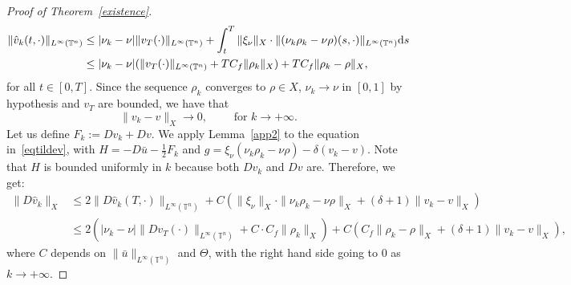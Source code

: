 \documentclass[10pt,a4paper,nouppercase,nowrite]{article}
\numberwithin{equation}{section}
\newcommand{\di}{{\rm d}}
\newcommand{\T}{\mathbb{T}}
\theoremstyle{definition}
\begin{document}
\begin{proof}[Proof of Theorem~\ref{existence}]
			\begin{equation*}
				\begin{aligned}
					\| \hat v_k (t,\cdot) \|_{L^{\infty}(\T^n)} & \le | \nu_k - \nu | \| v_T(\cdot) \|_{L^{\infty}(\T^n)} + \int_t^T \| \xi_\nu \|_X \cdot \| (\nu_k \rho_k - \nu \rho) (s,\cdot) \|_{L^{\infty}(\T^n)} \di s \\
					&\le | \nu_k - \nu |( \| v_T(\cdot) \|_{L^{\infty}(\T^n)} + T C_f \| \rho_k \|_X ) + T C_f \| \rho_k - \rho \|_X,
				\end{aligned}
			\end{equation*}
			for all $t \in [0,T]$. Since the sequence $\rho_k$ converges to $\rho \in X$, $\nu_k \to \nu$ in $[0,1]$ by hypothesis and $v_T$ are bounded, we have that
		 	$$\| v_k - v \|_X \to 0, \qquad \text{ for } k \to +\infty.$$
		 	Let us define $F_k:=Dv_k + Dv$. We apply Lemma~\ref{app2} to the equation in~\eqref{eqtildev}, with \mbox{$H=- D \bar u - \frac{1}{2}F_k$} and \mbox{$g = \xi_{\nu}(\nu_k \rho_k - \nu \rho) - \delta (v_k - v)$}. Note that $H$ is bounded uniformly in $k$ because both $Dv_k$ and $Dv$ are. Therefore, we get:
		 	\begin{equation*}
		 		\begin{aligned}
		 		\| D \hat v_k \|_X &\le 2 \| D \hat v_k(T,\cdot) \|_{L^{\infty}(\T^n)} + C \left( \| \xi_{\nu} \|_X \cdot \| \nu_k \rho_k - \nu \rho \|_X + (\delta+1) \|v_k - v \|_X \right) \\
		 		& \le 2 \left( | \nu_k - \nu | \| Dv_T(\cdot) \|_{L^{\infty}(\T^n)} + C \cdot C_f \|\rho_k\|_X \right) + C \left(C_f \| \rho_k - \rho \|_X + (\delta + 1) \| v_k - v \|_X \right),
		 		\end{aligned}
		 	\end{equation*}
		 	where $C$ depends on $\| \bar u \|_{L^{\infty}(\T^n)}$ and $\Theta$, with the right hand side going to $0$ as $k \to +\infty$.
		 	
		 	\medskip
		 

\end{proof}
\end{document}
